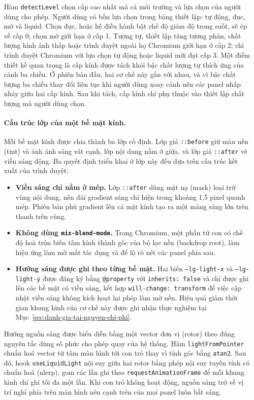 Hàm \texttt{detectLevel} chọn cấp cao nhất mà cả môi trường và lựa chọn của người dùng cho phép. Người dùng có bốn lựa chọn trong bảng thiết lập: tự động, đục, mờ và liquid. Chọn đục, hoặc hệ điều hành bật chế độ giảm độ trong suốt, sẽ ép về cấp 0; chọn mờ giới hạn ở cấp 1. Tương tự, thiết lập tăng tương phản, chất lượng hình ảnh thấp hoặc trình duyệt ngoài họ Chromium giới hạn ở cấp 2; chỉ trình duyệt Chromium với lựa chọn tự động hoặc liquid mới đạt cấp 3. Một điểm thiết kế quan trọng là cấp kính được tách khỏi bậc chất lượng tự thích ứng của cảnh ba chiều. Ở phiên bản đầu, hai cơ chế này gắn với nhau, và vì bậc chất lượng ba chiều thay đổi liên tục khi người dùng xoay cảnh nên các panel nhấp nháy giữa hai cấp kính. Sau khi tách, cấp kính chỉ phụ thuộc vào thiết lập chất lượng mà người dùng chọn.

\paragraph{Cấu trúc lớp của một bề mặt kính.} Mỗi bề mặt kính được chia thành ba lớp cố định. Lớp giả \texttt{::before} giữ màu nền (tint) và ảnh ánh sáng vát cạnh, lớp nội dung nằm ở giữa, và lớp giả \texttt{::after} vẽ viền sáng động. Ba quyết định triển khai ở lớp này đều dựa trên cấu trúc kết xuất của trình duyệt:
\begin{itemize}[label=$\bullet$]
    \item \textbf{Viền sáng chỉ nằm ở mép.} Lớp \texttt{::after} dùng mặt nạ (mask) loại trừ vùng nội dung, nên dải gradient sáng chỉ hiện trong khoảng 1,5 pixel quanh mép. Phiên bản phủ gradient lên cả mặt kính tạo ra một mảng sáng lớn trên thanh trên cùng.
    \item \textbf{Không dùng \texttt{mix-blend-mode}.} Trong Chromium, một phần tử con có chế độ hoà trộn biến tấm kính thành gốc của bộ lọc nền (backdrop root), làm hiệu ứng làm mờ mất tác dụng và để lộ rõ nét các panel phía sau.
    \item \textbf{Hướng sáng được ghi theo từng bề mặt.} Hai biến \texttt{--lg-light-x} và \texttt{--lg-light-y} được đăng ký bằng \texttt{@property} với \texttt{inherits: false} và chỉ được ghi lên các bề mặt có viền sáng, kết hợp \texttt{will-change: transform} để việc cập nhật viền sáng không kích hoạt lại phép làm mờ nền. Hiệu quả giảm thời gian khung hình của cơ chế này được ghi nhận thực nghiệm tại Mục~\ref{sec:danh-gia-tai-nguyen-chi-phi}.
\end{itemize}

Hướng nguồn sáng được biểu diễn bằng một vector đơn vị (rotor) theo đúng nguyên tắc dùng số phức cho phép quay của hệ thống. Hàm \texttt{lightFromPointer} chuẩn hoá vector từ tâm màn hình tới con trỏ thay vì tính góc bằng \texttt{atan2}. Sau đó, hook \texttt{useLiquidLight} nội suy giữa hai rotor bằng phép nội suy tuyến tính có chuẩn hoá (nlerp), gom các lần ghi theo \texttt{requestAnimationFrame} để mỗi khung hình chỉ ghi tối đa một lần. Khi con trỏ không hoạt động, nguồn sáng trở về vị trí nghỉ phía trên màn hình nên cạnh trên của mọi panel luôn bắt sáng.

